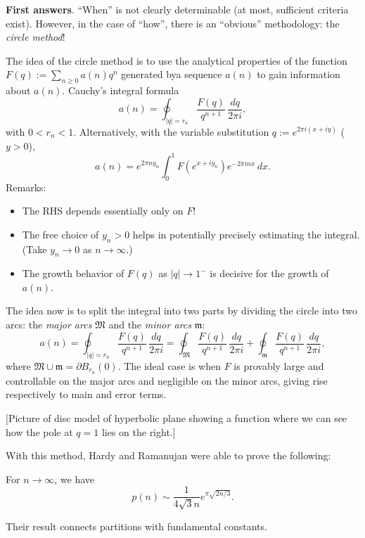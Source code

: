 \documentclass[reqno]{amsart} 
\numberwithin{theorem}{section}
\numberwithin{equation}{section}
\begin{document}
\textbf{First answers}.  ``When'' is not clearly determinable (at most, sufficient criteria exist).  However, in the case of ``how'', there is an ``obvious'' methodology: the \emph{circle method}!

The idea of the circle method is to use the analytical properties of the function $F(q) := \sum_{n \geq 0} a(n) q^n$ generated bya  sequence $a(n)$ to gain information about $a(n)$.  Cauchy's integral formula
\begin{equation*}
  a(n) = \oint_{\lvert q \rvert = r_n} \frac{F(q)}{q^{n + 1}} \, \frac{d q}{2 \pi i},
\end{equation*}
with $0 < r_n < 1$.  Alternatively, with the variable substitution $q := e^{2 \pi i(x + i y)}$ ($y > 0$),
\begin{equation*}
  a(n) = e^{2 \pi n y_n} \int_0^1 F(e^{x + i y_n}) e^{- 2 \pi i n x} \, d x.
\end{equation*}
Remarks:
\begin{itemize}
\item The RHS depends essentially only on $F$!
\item The free choice of $y_n > 0$ helps in potentially precisely estimating the integral.  (Take $y_n \rightarrow 0$ as $n \rightarrow \infty$.)
\item The growth behavior of $F(q)$ as $\lvert q \rvert \rightarrow 1^-$ is decisive for the growth of $a(n)$.
\end{itemize}
The idea now is to split the integral into two parts by dividing the circle into two arcs: the \emph{major arcs} $\mathfrak{M}$ and the \emph{minor arcs} $\mathfrak{m}$:
\begin{equation*}
  a(n) =
  \oint_{\lvert q \rvert = r_n} \frac{F(q)}{q^{n + 1}} \, \frac{d q}{2 \pi i}
  =
  \oint_{\mathfrak{M}} \frac{F(q)}{q^{n + 1}} \, \frac{d q}{2 \pi i}
  + \oint_{\mathfrak{m}} \frac{F(q)}{q^{n + 1}} \, \frac{d q}{2 \pi i},
\end{equation*}
where $\mathfrak{M} \cup \mathfrak{m} = \partial B_{r_n}(0)$.  The ideal case is when $F$ is provably large and controllable on the major arcs and negligible on the minor arcs, giving rise respectively to main and error terms.

[Picture of disc model of hyperbolic plane showing a function where we can see how the pole at $q = 1$ lies on the right.]

With this method, Hardy and Ramanujan were able to prove the following:
\begin{theorem}\label{theorem:cnrbxgr03s}
  For $n \rightarrow \infty$, we have
  \begin{equation*}
    p(n) \sim \frac{1}{4 \sqrt{3} n}
    e^{\pi \sqrt{2 n /3}}.
  \end{equation*}  
\end{theorem}
Their result connects partitions with fundamental constants.
\end{document}
